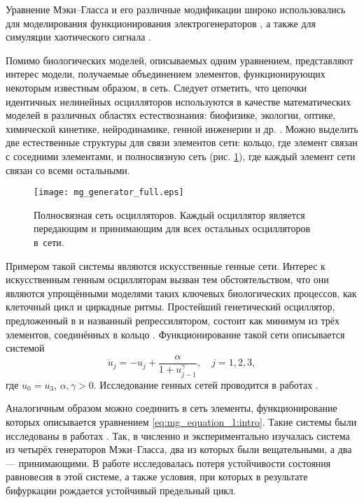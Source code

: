 Уравнение Мэки--Гласса и его различные модификации широко использовались для моделирования функционирования электрогенераторов \cite{Tateno2012, Namajunas1995, Glyzin2018, Glyzin2018a}, а также для симуляции хаотического сигнала \cite{Grassberger1983, Amil2015, Amil2015a, Shahverdiev2006}.

Помимо биологических моделей, описываемых одним уравнением, представляют интерес модели, получаемые объединением элементов, функционирующих некоторым известным образом, в сеть. Следует отметить, что цепочки идентичных нелинейных осцилляторов используются в качестве математических моделей в различных областях естествознания: биофизике, экологии, оптике, химической кинетике, нейродинамике, генной инженерии и др. \cite{Glyzin2022}. Можно выделить две естественные структуры для связи элементов сети: кольцо, где элемент связан с соседними элементами, и полносвязную сеть (рис. \ref{fig:full_mesh:intro}), где каждый элемент сети связан со всеми остальными.

\begin{figure}[ht]
	\centering
	\texttt{[image: mg\_generator\_full.eps]}
	\caption{Полносвязная сеть осцилляторов. Каждый осциллятор является передающим и принимающим для всех остальных осцилляторов в~сети.}
	\label{fig:full_mesh:intro}
\end{figure}

Примером такой системы являются искусственные генные сети. Интерес к искусственным генным осцилляторам вызван тем обстоятельством, что они являются упрощёнными моделями таких ключевых биологических процессов, как клеточный цикл и циркадные ритмы. Простейший генетический осциллятор, предложенный в \cite{Elowitz2000} и названный репрессилятором, состоит как минимум из трёх элементов, соединённых в кольцо \cite{Glyzin2017, GlyzinBook2018}. Функционирование такой сети описывается системой
\begin{equation}
	\label{eq:intro:repressilator}
	\dot{u}_j = -u_j + \dfrac{\alpha}{1 + u^{\gamma}_{j - 1}}, \quad j = 1, 2, 3,
\end{equation}
где $u_0 = u_3$, $\alpha, \gamma > 0$. Исследование генных сетей проводится в работах \cite{Likhoshvaj2003, Volokitin2004, Golubyatnikov2006, Buse2009, Buse2010}.

Аналогичным образом можно соединить в сеть элементы, функционирование которых описывается уравнением \eqref{eq:mg_equation_1:intro}. Такие системы были исследованы в работах \cite{Preobrazhenskaia2021, Tateno2012, Sano2007, Wan2009}. Так, в \cite{Sano2007} численно и экспериментально изучалась система из четырёх генераторов Мэки--Гласса, два из которых были вещательными, а два --- принимающими. В работе \cite{Wan2009} исследовалась потеря устойчивости состояния равновесия в этой системе, а также условия, при которых в результате бифуркации рождается устойчивый предельный цикл.


